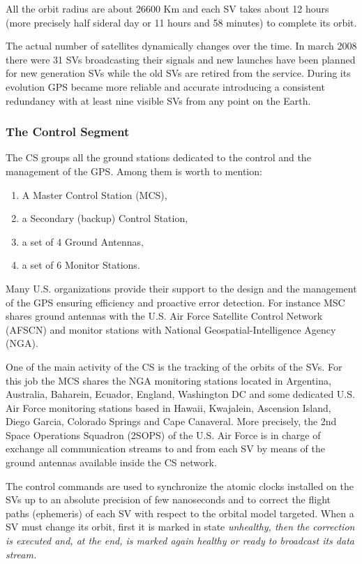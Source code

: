 \documentclass[PhD,binding=0.6cm]{dithesis}
\begin{document}
All the orbit radius are about 26600 Km and each SV takes about 12 hours (more precisely half sideral day or 11 hours and 58 minutes) to complete its orbit.

The actual number of satellites dynamically changes over the time. In march 2008 there were 31 SVs broadcasting their signals and new launches have been planned for new generation SVs while the old SVs are retired from the service. During its evolution GPS became more reliable and accurate introducing a consistent redundancy with at least nine visible SVs from any point on the Earth.

\subsubsection{The Control Segment}

The CS groups all the ground stations dedicated to the control and the management of the GPS. Among them is worth to mention:
\begin{enumerate}
\item A Master Control Station (MCS),
\item a Secondary (backup) Control Station, 
\item a set of 4 Ground Antennas,
\item a set of 6 Monitor Stations.
\end{enumerate}

Many U.S. organizations provide their support to the design and the management of the GPS ensuring efficiency and proactive error detection. For instance MSC shares ground antennas with the U.S. Air Force Satellite Control Network (AFSCN) and monitor stations with National Geospatial-Intelligence Agency (NGA).

One of the main activity of the CS is the tracking of the orbits of the SVs. For this job the MCS shares the NGA monitoring stations located in Argentina, Australia, Baharein, Ecuador, England, Washington DC and  some dedicated U.S. Air Force monitoring stations based in Hawaii, Kwajalein, Ascension Island, Diego Garcia, Colorado Springs and Cape Canaveral. More precisely, the 2nd Space Operations Squadron (2SOPS) of the U.S. Air Force is in charge of exchange all communication streams to and from each SV by means of the ground antennas available inside the CS network.

The control commands are used to synchronize the atomic clocks installed on the SVs up to an absolute precision of few nanoseconds and to correct the flight paths (ephemeris) of each SV with respect to the orbital model targeted. When a SV must change its orbit, first it is marked in state \em{unhealthy}, then the correction is executed and, at the end, is marked again \em{healthy} or ready to broadcast its data stream.
\end{document}
